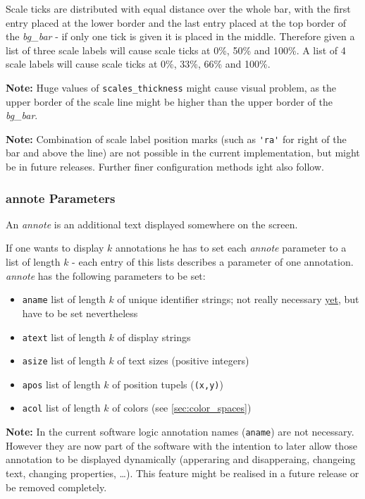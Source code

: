 \documentclass[12pt,a4paper]{book}
\begin{document}
Scale ticks are distributed with equal distance over the whole bar, with the first entry placed at the lower border and the last entry placed at the top border of the \textit{bg\_bar} - if only one tick is given it is placed in the middle. Therefore given a list of three scale labels will cause scale ticks at 0\%, 50\% and 100\%. A list of 4 scale labels will cause scale ticks at 0\%, 33\%, 66\% and 100\%.

\textbf{Note:} Huge values of \verb|scales_thickness| might cause visual problem, as the upper border of the scale line might be higher than the upper border of the \textit{bg\_bar}.

\textbf{Note:} Combination of scale label position marks (such as \verb|'ra'| for right of the bar and above the line) are not possible in the current implementation, but might be in future releases. Further finer configuration methods ight also follow.

\subsubsection{annote Parameters}

An \textit{annote} is an additional text displayed somewhere on the screen.

If one wants to display $k$ annotations he has to set each \textit{annote} parameter to a list of length $k$ - each entry of this lists describes a parameter of one annotation. \textit{annote} has the following parameters to be set:
\begin{itemize}
	\item \verb|aname| list of length $k$ of unique identifier strings; not really necessary \underline{yet}, but have to be set nevertheless 
	\item \verb|atext| list of length $k$ of display strings
	\item \verb|asize| list of length $k$ of text sizes (positive integers)
	\item \verb|apos| list of length $k$ of position tupels (\verb|(x,y)|)
	\item \verb|acol| list of length $k$ of colors (see \ref{sec:color_spaces})
\end{itemize}

\textbf{Note:} In the current software logic annotation names (\verb|aname|) are not necessary. However they are now part of the software with the intention to later allow those annotation to be displayed dynamically (apperaring and disapperaing, changeing text, changing properties, \dots). This feature might be realised in a future release or be removed completely.
\end{document}
